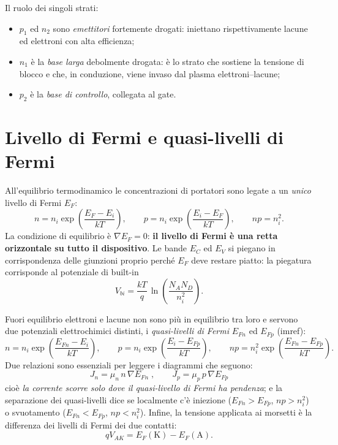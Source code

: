 Il ruolo dei singoli strati:
\begin{itemize}\itemsep2pt
  \item $p_1$ ed $n_2$ sono \emph{emettitori} fortemente drogati: iniettano
        rispettivamente lacune ed elettroni con alta efficienza;
  \item $n_1$ è la \emph{base larga} debolmente drogata: è lo strato che sostiene
        la tensione di blocco e che, in conduzione, viene invaso dal plasma
        elettroni--lacune;
  \item $p_2$ è la \emph{base di controllo}, collegata al gate.
\end{itemize}

\section{Livello di Fermi e quasi-livelli di Fermi}

All'equilibrio termodinamico le concentrazioni di portatori sono legate a un
\emph{unico} livello di Fermi $E_F$:
\begin{equation}
n = n_i \exp\!\left(\frac{E_F-E_i}{kT}\right),\qquad
p = n_i \exp\!\left(\frac{E_i-E_F}{kT}\right),\qquad
np = n_i^2 .
\end{equation}
La condizione di equilibrio è $\nabla E_F = 0$: \textbf{il livello di Fermi è una
retta orizzontale su tutto il dispositivo}. Le bande $E_C$ ed $E_V$ si piegano in
corrispondenza delle giunzioni proprio perché $E_F$ deve restare piatto: la
piegatura corrisponde al potenziale di built-in
\begin{equation}
V_{bi}=\frac{kT}{q}\,\ln\!\left(\frac{N_A N_D}{n_i^2}\right).
\end{equation}

Fuori equilibrio elettroni e lacune non sono più in equilibrio tra loro e servono
due potenziali elettrochimici distinti, i \emph{quasi-livelli di Fermi} $E_{Fn}$
ed $E_{Fp}$ (imref):
\begin{equation}
n = n_i \exp\!\left(\frac{E_{Fn}-E_i}{kT}\right),\qquad
p = n_i \exp\!\left(\frac{E_i-E_{Fp}}{kT}\right),\qquad
np = n_i^2 \exp\!\left(\frac{E_{Fn}-E_{Fp}}{kT}\right).
\end{equation}
Due relazioni sono essenziali per leggere i diagrammi che seguono:
\begin{equation}
\boxed{\;J_n = \mu_n\,n\,\nabla E_{Fn}\;,\qquad J_p = \mu_p\,p\,\nabla E_{Fp}\;}
\label{thyfermi:eq:corrente}
\end{equation}
cioè \emph{la corrente scorre solo dove il quasi-livello di Fermi ha pendenza};
e la separazione dei quasi-livelli dice se localmente c'è iniezione
($E_{Fn}>E_{Fp}$, $np>n_i^2$) o svuotamento ($E_{Fn}<E_{Fp}$, $np<n_i^2$).
Infine, la tensione applicata ai morsetti è la differenza dei livelli di Fermi
dei due contatti:
\begin{equation}
qV_{AK} = E_F(\mathrm{K}) - E_F(\mathrm{A}).
\end{equation}

